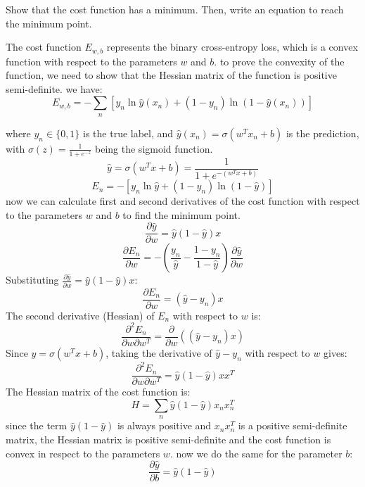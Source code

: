 Show that the cost function has a minimum. Then, write an equation to reach the minimum point.
\begin{qsolve}
    \begin{qsolve}[]
        The cost function \( E_{w,b} \) represents the binary cross-entropy loss, which is a convex function with respect to the parameters \( w \) and \( b \). to prove the convexity of the function, we need to show that the Hessian matrix of the function is positive semi-definite. we have:
        \[
        E_{w,b} = -\sum_n \left[ y_n \ln \hat{y}(x_n) + (1 - y_n) \ln (1 - \hat{y}(x_n)) \right]
        \]

        where \( y_n \in \{0, 1\} \) is the true label, and \( \hat{y}(x_n) = \sigma(w^T x_n + b) \) is the prediction, with \( \sigma(z) = \frac{1}{1 + e^{-z}} \) being the sigmoid function.
        \[
        \hat{y} = \sigma(w^T x + b) = \frac{1}{1 + e^{-(w^T x + b)}}
        \]
        \[
        E_n = - \left[ y_n \ln \hat{y} + (1 - y_n) \ln (1 - \hat{y}) \right]
        \]
        \splitqsolve[\splitqsolve]
        now we can calculate first and second derivatives of the cost function with respect to the parameters \( w \) and \( b \) to find the minimum point.
        \[
        \frac{\partial \hat{y}}{\partial w} = \hat{y}(1 - \hat{y}) x
        \]
        \[
        \frac{\partial E_n}{\partial w} = -\left( \frac{y_n}{\hat{y}} - \frac{1 - y_n}{1 - \hat{y}} \right) \frac{\partial \hat{y}}{\partial w}
        \]
        Substituting \( \frac{\partial \hat{y}}{\partial w} = \hat{y}(1 - \hat{y}) x \):
        \[
        \frac{\partial E_n}{\partial w} = ( \hat{y} - y_n ) x
        \]
        The second derivative (Hessian) of \( E_n \) with respect to \( w \) is:
        \[
        \frac{\partial^2 E_n}{\partial w \partial w^T} = \frac{\partial}{\partial w} \left( ( \hat{y} - y_n ) x \right)
        \]
        Since \( \hat{y} = \sigma(w^T x + b) \), taking the derivative of \( \hat{y} - y_n \) with respect to \( w \) gives:
        \[
        \frac{\partial^2 E_n}{\partial w \partial w^T} = \hat{y}(1 - \hat{y}) x x^T
        \]
        The Hessian matrix of the cost function is:
        \[
        H = \sum_n \hat{y}(1 - \hat{y}) x_n x_n^T
        \]
        since the term \( \hat{y}(1 - \hat{y}) \) is always positive and \( x_n x_n^T \) is a positive semi-definite matrix, the Hessian matrix is positive semi-definite and the cost function is convex in respect to the parameters \( w \). now we do the same for the parameter \( b \):
        \[
        \frac{\partial \hat{y}}{\partial b} = \hat{y}(1 - \hat{y})
\]
\end{qsolve}
\end{qsolve}
